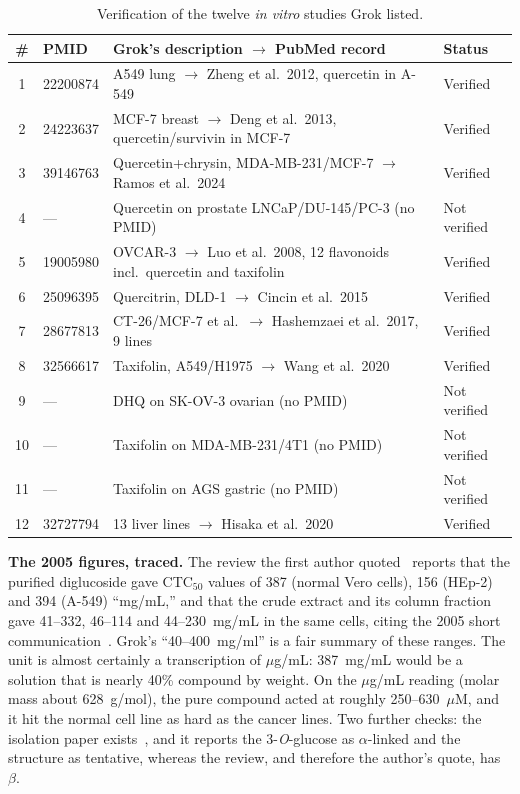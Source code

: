 \documentclass[11pt,a4paper]{article}
\begin{document}
\begin{table}[H]
\centering\small
\caption{Verification of the twelve \emph{in vitro} studies Grok listed.}
\label{tab:pmid}
\begin{tabularx}{\textwidth}{@{}c l X l@{}}
\toprule
\# & \textbf{PMID} & \textbf{Grok's description $\rightarrow$ PubMed record} & \textbf{Status}\\
\midrule
1 & 22200874 & A549 lung $\rightarrow$ Zheng et al.\ 2012, quercetin in A-549~\cite{zheng2012} & Verified\\
2 & 24223637 & MCF-7 breast $\rightarrow$ Deng et al.\ 2013, quercetin/survivin in MCF-7~\cite{deng2013} & Verified\\
3 & 39146763 & Quercetin+chrysin, MDA-MB-231/MCF-7 $\rightarrow$ Ramos et al.\ 2024~\cite{ramos2024} & Verified\\
4 & --- & Quercetin on prostate LNCaP/DU-145/PC-3 (no PMID) & Not verified\\
5 & 19005980 & OVCAR-3 $\rightarrow$ Luo et al.\ 2008, 12 flavonoids incl.\ quercetin and taxifolin~\cite{luo2008} & Verified\\
6 & 25096395 & Quercitrin, DLD-1 $\rightarrow$ Cincin et al.\ 2015~\cite{cincin2015} & Verified\\
7 & 28677813 & CT-26/MCF-7 et al.\ $\rightarrow$ Hashemzaei et al.\ 2017, 9 lines~\cite{hashemzaei2017} & Verified\\
8 & 32566617 & Taxifolin, A549/H1975 $\rightarrow$ Wang et al.\ 2020~\cite{wang2020} & Verified\\
9 & --- & DHQ on SK-OV-3 ovarian (no PMID) & Not verified\\
10 & --- & Taxifolin on MDA-MB-231/4T1 (no PMID) & Not verified\\
11 & --- & Taxifolin on AGS gastric (no PMID) & Not verified\\
12 & 32727794 & 13 liver lines $\rightarrow$ Hisaka et al.\ 2020~\cite{hisaka2020} & Verified\\
\bottomrule
\end{tabularx}
\end{table}

\noindent \textbf{The 2005 figures, traced.} The review the first author quoted~\cite{meira2012} reports that the purified diglucoside gave CTC$_{50}$ values of 387 (normal Vero cells), 156 (HEp-2) and 394 (A-549) ``mg/mL,'' and that the crude extract and its column fraction gave 41--332, 46--114 and 44--230~mg/mL in the same cells, citing the 2005 short communication~\cite{prasad2005b}. Grok's ``40--400~mg/ml'' is a fair summary of these ranges. The unit is almost certainly a transcription of $\mu$g/mL: 387~mg/mL would be a solution that is nearly 40\% compound by weight. On the $\mu$g/mL reading (molar mass about 628~g/mol), the pure compound acted at roughly 250--630~$\mu$M, and it hit the normal cell line as hard as the cancer lines. Two further checks: the isolation paper exists~\cite{prasad2005}, and it reports the 3-\emph{O}-glucose as $\alpha$-linked and the structure as tentative, whereas the review, and therefore the author's quote, has $\beta$.
\end{document}
